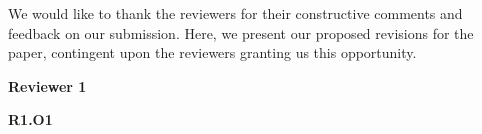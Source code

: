 We would like to thank the reviewers for their constructive comments and feedback on our submission. Here, we present our proposed revisions for the
paper, contingent upon the reviewers granting us this opportunity.

\noindent \textbf{Reviewer 1}

\noindent \textbf{R1.O1}